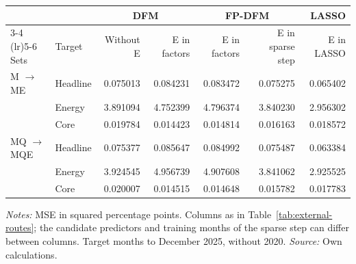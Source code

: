 \begin{threeparttable}
\begin{tabular}{@{}llrrrrr@{}}
\toprule
\multicolumn{2}{c}{} & \multicolumn{2}{c}{DFM} & \multicolumn{2}{c}{FP-DFM} & LASSO \\
\cmidrule(lr){3-4} \cmidrule(lr){5-6}
Sets & Target & Without E & E in factors & E in factors & E in sparse step & E in LASSO \\
\midrule
M $\to$ ME & Headline & 0.075013 & 0.084231 & 0.083472 & 0.075275 & 0.065402 \\
 & Energy & 3.891094 & 4.752399 & 4.796374 & 3.840230 & 2.956302 \\
 & Core & 0.019784 & 0.014423 & 0.014814 & 0.016163 & 0.018572 \\
\midrule
MQ $\to$ MQE & Headline & 0.075377 & 0.085647 & 0.084992 & 0.075487 & 0.063384 \\
 & Energy & 3.924545 & 4.956739 & 4.907608 & 3.841062 & 2.925525 \\
 & Core & 0.020007 & 0.014515 & 0.014648 & 0.015782 & 0.017783 \\
\bottomrule
\end{tabular}
\begin{tablenotes}[flushleft]\footnotesize
\item \textit{Notes:} MSE in squared percentage points. Columns as in Table~\ref{tab:external-routes}; the candidate predictors and training months of the sparse step can differ between columns. Target months to December 2025, without 2020. \textit{Source:} Own calculations.
\end{tablenotes}
\end{threeparttable}
